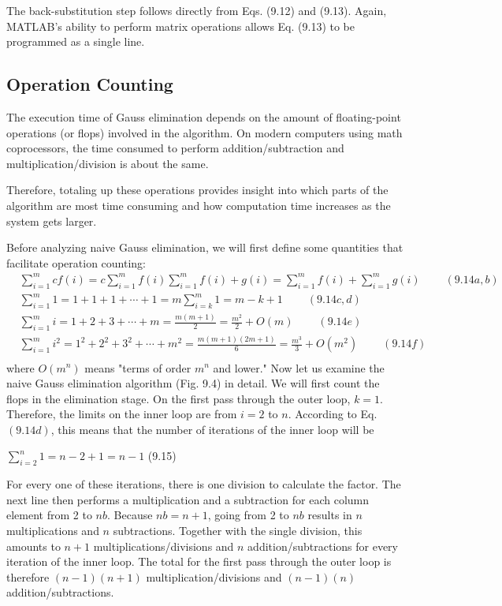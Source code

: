 \documentclass[../main.tex]{subfiles}
\begin{document}
The back-substitution step follows directly from Eqs. (9.12) and (9.13). Again, MATLAB's ability to perform matrix operations allows Eq. (9.13) to be programmed as a single line.

\subsection{Operation Counting}
The execution time of Gauss elimination depends on the amount of floating-point operations (or flops) involved in the algorithm. On modern computers using math coprocessors, the time consumed to perform addition/subtraction and multiplication/division is about the same.

\noindent Therefore, totaling up these operations provides insight into which parts of the algorithm are most time consuming and how computation time increases as the system gets larger.

Before analyzing naive Gauss elimination, we will first define some quantities that facilitate operation counting:
$$
\begin{aligned}
&\sum_{i=1}^{m} c f(i)=c \sum_{i=1}^{m} f(i) \sum_{i=1}^{m} f(i)+g(i)=\sum_{i=1}^{m} f(i)+\sum_{i=1}^{m} g(i)   \ \ \ \ \ \ \ \ \ \ (9.14a,b)\\
&\sum_{i=1}^{m} 1=1+1+1+\cdots+1=m \sum_{i=k}^{m} 1=m-k+1   \ \ \ \ \ \ \ \ \ \ (9.14c,d)\\
&\sum_{i=1}^{m} i=1+2+3+\cdots+m=\frac{m(m+1)}{2}=\frac{m^{2}}{2}+O(m)   \ \ \ \ \ \ \ \ \ \ (9.14e)\\
&\sum_{i=1}^{m} i^{2}=1^{2}+2^{2}+3^{2}+\cdots+m^{2}=\frac{m(m+1)(2 m+1)}{6}=\frac{m^{3}}{3}+O\left(m^{2}\right)   \ \ \ \ \ \ \ \ \ \ (9.14f)\\
\end{aligned}
$$
where $O\left(m^{n}\right)$ means "terms of order $m^{n}$ and lower."
Now let us examine the naive Gauss elimination algorithm (Fig. 9.4) in detail. We will first count the flops in the elimination stage. On the first pass through the outer loop, $k=1$. Therefore, the limits on the inner loop are from $i=2$ to $n$. According to Eq. $(9.14 d)$, this means that the number of iterations of the inner loop will be
\bigskip

$\sum_{i=2}^{n} 1=n-2+1=n-1$ \hfill{(9.15)}\bigskip

\noindent For every one of these iterations, there is one division to calculate the factor. The next line then performs a multiplication and a subtraction for each column element from 2 to $n b$. Because $n b=n+1$, going from 2 to $n b$ results in $n$ multiplications and $n$ subtractions. Together with the single division, this amounts to $n+1$ multiplications/divisions and $n$ addition/subtractions for every iteration of the inner loop. The total for the first pass through the outer loop is therefore $(n-1)(n+1)$ multiplication/divisions and $(n-1)(n)$ addition/subtractions.
\end{document}
